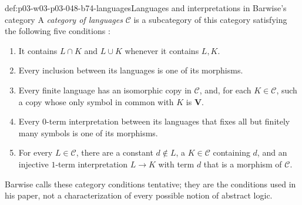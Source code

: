 \begin{hbdefinition}{def:p03-w03-p03-048-b74-languages}{Languages and interpretations in Barwise's category}
A \emph{category of languages} \(\mathcal C\) is a subcategory of
this category satisfying the following five conditions
\cite[Part~I, \S6, Definition~6.2, pp.~233--234]{Barwise1974Axioms}:
\begin{enumerate}
\item It contains \(L\cap K\) and \(L\cup K\) whenever it contains
      \(L,K\).
\item Every inclusion between its languages is one of its morphisms.
\item Every finite language has an isomorphic copy in \(\mathcal C\),
      and, for each \(K\in\mathcal C\), such a copy whose only symbol
      in common with \(K\) is \(\mathbf V\).
\item Every \(0\)-term interpretation between its languages that fixes
      all but finitely many symbols is one of its morphisms.
\item For every \(L\in\mathcal C\), there are a constant \(d\notin L\),
      a \(K\in\mathcal C\) containing \(d\), and an injective
      \(1\)-term interpretation \(L\to K\) with term \(d\) that is
      a morphism of \(\mathcal C\).
\end{enumerate}
Barwise calls these category conditions tentative; they are the
conditions used in his paper, not a characterization of every possible
notion of abstract logic.
\end{hbdefinition}

